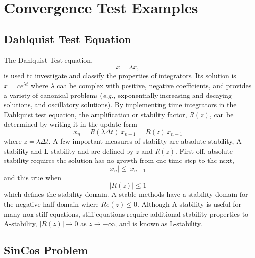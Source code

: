 \cleardoublepage{}

\section{Convergence Test Examples}

\subsection{Dahlquist Test Equation\label{rythmos:sec:Dahlquist-Test}}

The Dahlquist Test equation,
\begin{equation}
\dot{x}=\lambda x,\label{rymthos:eq:Dahlquist-Test}
\end{equation}
is used to investigate and classify the properties of integrators.
Its solution is $x=ce^{\lambda t}$ where $\lambda$ can be complex
with positive, negative coefficients, and provides a variety of canonical
problems (\emph{e.g.}, exponentially increasing and decaying solutions,
and oscillatory solutions). By implementing time integrators in the
Dahlquist test equation, the amplification or stability factor, $R(z)$,
can be determined by writing it in the update form
\[
x_{n}=R(\lambda\Delta t)\,x_{n-1}=R(z)\,x_{n-1}
\]
where $z=\lambda\Delta t$. A few important measures of stability
are absolute stability, A-stability and L-stability and are defined
by $z$ and $R(z)$. First off, absolute stability requires the solution
has no growth from one time step to the next, 
\[
\left|x_{n}\right|\leq\left|x_{n-1}\right|
\]
and this true when
\[
\left|R(z)\right|\leq1
\]
which defines the stability domain. A-stable methods have a stability
domain for the negative half domain where $Re(z)\leq0$. Although
A-stability is useful for many non-stiff equations, stiff equations
require additional stability properties to A-stability, $\left|R(z)\right|\rightarrow0$
as $z\rightarrow-\infty$, and is known as L-stability.

\subsection{SinCos Problem\label{rythmos:sec:SinCos-Problem}}

